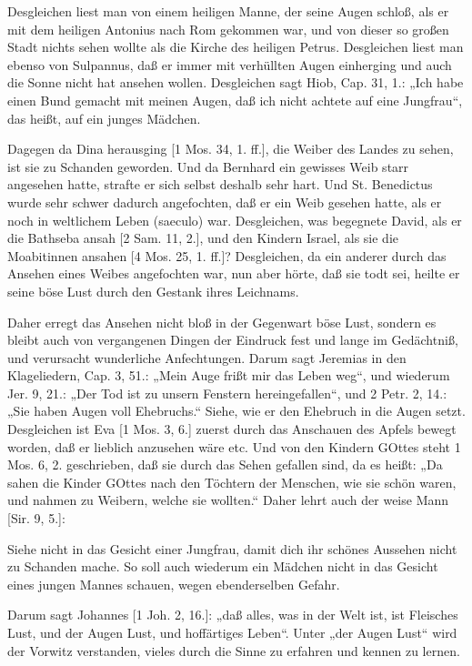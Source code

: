 Desgleichen liest man von einem heiligen Manne, der seine Augen schloß, als er mit dem heiligen Antonius nach Rom gekommen war, und von dieser so großen Stadt nichts sehen wollte als die Kirche des heiligen Petrus. Desgleichen liest man ebenso von Sulpannus, daß er immer mit verhüllten Augen einherging und auch die Sonne nicht hat ansehen wollen. Desgleichen sagt Hiob, Cap. 31, 1.: „Ich habe einen Bund gemacht mit meinen Augen, daß ich nicht achtete auf eine Jungfrau“, das heißt, auf ein junges Mädchen.

Dagegen da Dina herausging [1 Mos. 34, 1. ff.], die Weiber des Landes zu sehen, ist sie zu Schanden geworden. Und da Bernhard ein gewisses Weib starr angesehen hatte, strafte er sich selbst deshalb sehr hart. Und St. Benedictus wurde sehr schwer dadurch angefochten, daß er ein Weib gesehen hatte, als er noch in weltlichem Leben (saeculo) war. Desgleichen, was begegnete David, als er die Bathseba ansah [2 Sam. 11, 2.], und den Kindern Israel, als sie die Moabitinnen ansahen [4 Mos. 25, 1. ff.]? Desgleichen, da ein anderer durch das Ansehen eines Weibes angefochten war, nun aber hörte, daß sie todt sei, heilte er seine böse Lust durch den Gestank ihres Leichnams.

Daher erregt das Ansehen nicht bloß in der Gegenwart böse Lust, sondern es bleibt auch von vergangenen Dingen der Eindruck fest und lange im Gedächtniß, und verursacht wunderliche Anfechtungen. Darum sagt Jeremias in den Klageliedern, Cap. 3, 51.: „Mein Auge frißt mir das Leben weg“, und wiederum Jer. 9, 21.: „Der Tod ist zu unsern Fenstern hereingefallen“, und 2 Petr. 2, 14.: „Sie haben Augen voll Ehebruchs.“ Siehe, wie er den Ehebruch in die Augen setzt. Desgleichen ist Eva [1 Mos. 3, 6.] zuerst durch das Anschauen des Apfels bewegt worden, daß er lieblich anzusehen wäre etc. Und von den Kindern GOttes steht 1 Mos. 6, 2. geschrieben, daß sie durch das Sehen gefallen sind, da es heißt: „Da sahen die Kinder GOttes nach den Töchtern der Menschen, wie sie schön waren, und nahmen zu Weibern, welche sie wollten.“ Daher lehrt auch der weise Mann [Sir. 9, 5.]:

Siehe nicht in das Gesicht einer Jungfrau, damit dich ihr schönes Aussehen nicht zu Schanden mache. So soll auch wiederum ein Mädchen nicht in das Gesicht eines jungen Mannes schauen, wegen ebenderselben Gefahr.

Darum sagt Johannes [1 Joh. 2, 16.]: „daß alles, was in der Welt ist, ist Fleisches Lust, und der Augen Lust, und hoffärtiges Leben“. Unter „der Augen Lust“ wird der Vorwitz verstanden, vieles durch die Sinne zu erfahren und kennen zu lernen.

